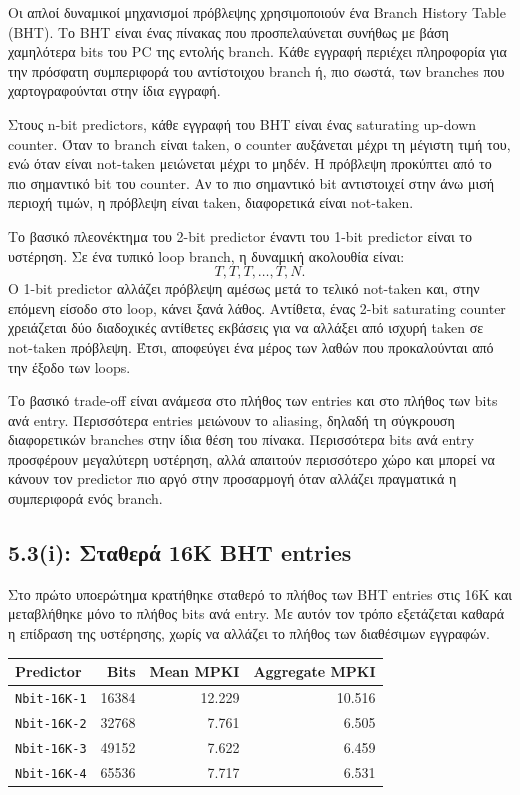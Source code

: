 \documentclass{article}
\begin{document}
Οι απλοί δυναμικοί μηχανισμοί πρόβλεψης χρησιμοποιούν ένα \foreignlanguage{english}{Branch History Table} (BHT). Το BHT είναι ένας πίνακας που προσπελαύνεται συνήθως με βάση χαμηλότερα bits του PC της εντολής branch. Κάθε εγγραφή περιέχει πληροφορία για την πρόσφατη συμπεριφορά του αντίστοιχου branch ή, πιο σωστά, των branches που χαρτογραφούνται στην ίδια εγγραφή.

Στους n-bit predictors, κάθε εγγραφή του BHT είναι ένας saturating up-down counter. Όταν το branch είναι taken, ο counter αυξάνεται μέχρι τη μέγιστη τιμή του, ενώ όταν είναι not-taken μειώνεται μέχρι το μηδέν. Η πρόβλεψη προκύπτει από το πιο σημαντικό bit του counter. Αν το πιο σημαντικό bit αντιστοιχεί στην άνω μισή περιοχή τιμών, η πρόβλεψη είναι taken, διαφορετικά είναι not-taken.

Το βασικό πλεονέκτημα του 2-bit predictor έναντι του 1-bit predictor είναι το υστέρηση. Σε ένα τυπικό loop branch, η δυναμική ακολουθία είναι:
\[
    T, T, T, \ldots, T, N.
\]
Ο 1-bit predictor αλλάζει πρόβλεψη αμέσως μετά το τελικό not-taken και, στην επόμενη είσοδο στο loop, κάνει ξανά λάθος. Αντίθετα, ένας 2-bit saturating counter χρειάζεται δύο διαδοχικές αντίθετες εκβάσεις για να αλλάξει από ισχυρή taken σε not-taken πρόβλεψη. Έτσι, αποφεύγει ένα μέρος των λαθών που προκαλούνται από την έξοδο των loops.

Το βασικό trade-off είναι ανάμεσα στο πλήθος των entries και στο πλήθος των bits ανά entry. Περισσότερα entries μειώνουν το aliasing, δηλαδή τη σύγκρουση διαφορετικών branches στην ίδια θέση του πίνακα. Περισσότερα bits ανά entry προσφέρουν μεγαλύτερη υστέρηση, αλλά απαιτούν περισσότερο χώρο και μπορεί να κάνουν τον predictor πιο αργό στην προσαρμογή όταν αλλάζει πραγματικά η συμπεριφορά ενός branch.

\subsection{5.3(i): Σταθερά 16K BHT entries}

Στο πρώτο υποερώτημα κρατήθηκε σταθερό το πλήθος των BHT entries στις 16K και μεταβλήθηκε μόνο το πλήθος bits ανά entry. Με αυτόν τον τρόπο εξετάζεται καθαρά η επίδραση της υστέρησης, χωρίς να αλλάζει το πλήθος των διαθέσιμων εγγραφών.

\begin{center}
\begin{tabular}{lrrr}
\toprule
Predictor & Bits & Mean MPKI & Aggregate MPKI \\
\midrule
\texttt{Nbit-16K-1} & 16384 & 12.229 & 10.516 \\
\texttt{Nbit-16K-2} & 32768 & 7.761 & 6.505 \\
\texttt{Nbit-16K-3} & 49152 & 7.622 & 6.459 \\
\texttt{Nbit-16K-4} & 65536 & 7.717 & 6.531 \\
\bottomrule
\end{tabular}
\label{tab:nbit_16k}
\end{center}
\end{document}
